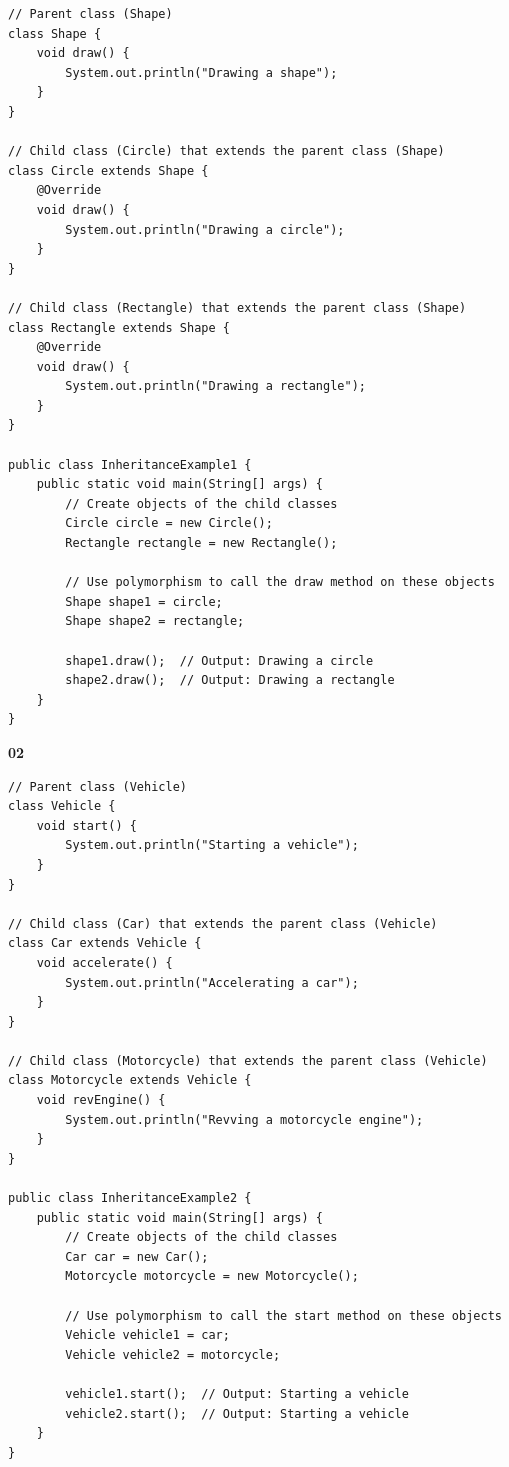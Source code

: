 \documentclass{book}
\begin{document}
\begin{verbatim}
// Parent class (Shape)
class Shape {
    void draw() {
        System.out.println("Drawing a shape");
    }
}

// Child class (Circle) that extends the parent class (Shape)
class Circle extends Shape {
    @Override
    void draw() {
        System.out.println("Drawing a circle");
    }
}

// Child class (Rectangle) that extends the parent class (Shape)
class Rectangle extends Shape {
    @Override
    void draw() {
        System.out.println("Drawing a rectangle");
    }
}

public class InheritanceExample1 {
    public static void main(String[] args) {
        // Create objects of the child classes
        Circle circle = new Circle();
        Rectangle rectangle = new Rectangle();

        // Use polymorphism to call the draw method on these objects
        Shape shape1 = circle;
        Shape shape2 = rectangle;

        shape1.draw();  // Output: Drawing a circle
        shape2.draw();  // Output: Drawing a rectangle
    }
}
\end{verbatim}

\textbf{02}

\begin{verbatim}
// Parent class (Vehicle)
class Vehicle {
    void start() {
        System.out.println("Starting a vehicle");
    }
}

// Child class (Car) that extends the parent class (Vehicle)
class Car extends Vehicle {
    void accelerate() {
        System.out.println("Accelerating a car");
    }
}

// Child class (Motorcycle) that extends the parent class (Vehicle)
class Motorcycle extends Vehicle {
    void revEngine() {
        System.out.println("Revving a motorcycle engine");
    }
}

public class InheritanceExample2 {
    public static void main(String[] args) {
        // Create objects of the child classes
        Car car = new Car();
        Motorcycle motorcycle = new Motorcycle();

        // Use polymorphism to call the start method on these objects
        Vehicle vehicle1 = car;
        Vehicle vehicle2 = motorcycle;

        vehicle1.start();  // Output: Starting a vehicle
        vehicle2.start();  // Output: Starting a vehicle
    }
}
\end{verbatim}
\end{document}
